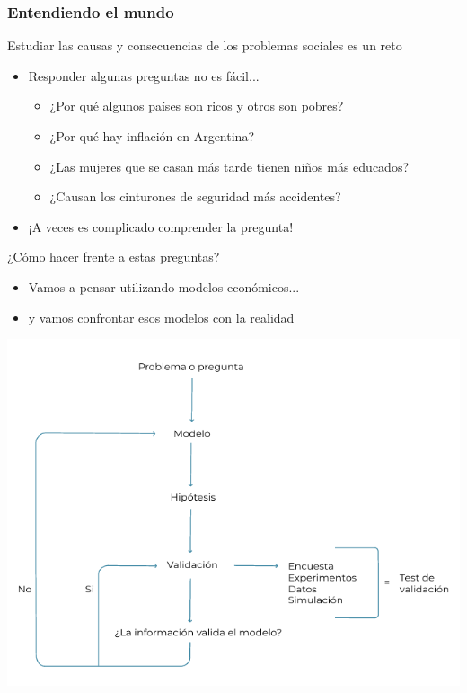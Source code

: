 \documentclass{beamer}
\begin{document}
\begin{frame}
\frametitle{Entendiendo el mundo}
Estudiar las causas y consecuencias de los problemas sociales es un reto 
\begin{itemize}
    \item Responder algunas preguntas no es fácil...
    \begin{itemize}
        \item ¿Por qué algunos países son ricos y otros son pobres?
        \item ¿Por qué hay inflación en Argentina?
        \item ¿Las mujeres que se casan más tarde tienen niños más educados?
        \item ¿Causan los cinturones de seguridad más accidentes?
        \end{itemize}
    \item ¡A veces es complicado comprender la pregunta!
\end{itemize}
\end{frame}

\begin{frame}{¿Cómo hacer frente a estas preguntas?}
        \begin{itemize}
                \item Vamos a pensar utilizando modelos económicos... \vspace{2mm}
                \item y vamos confrontar esos modelos con la realidad
        \end{itemize} \vspace{2mm}
    \begin{center}
        \includegraphics[scale=0.5]{../Figures/C.1.4.png}
    \end{center}
\end{frame}
\end{document}

